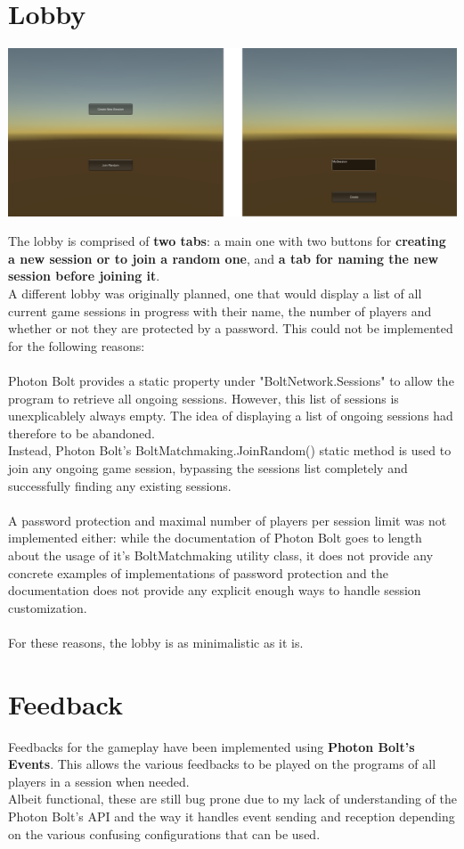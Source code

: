 \documentclass[12pt,a4paper]{article}
\begin{document}
\section{Lobby}
\begin{center}
\includegraphics[scale=0.4]{lobby}
\end{center}
The lobby is comprised of \textbf{two tabs}: a main one with two buttons for \textbf{creating a new session or to join a random one}, and \textbf{a tab for naming the new session before joining it}.\\
A different lobby was originally planned, one that would display a list of all current game sessions in progress with their name, the number of players and whether or not they are protected by a password. This could not be implemented for the following reasons:\\\\
Photon Bolt provides a static property under "BoltNetwork.Sessions" to allow the program to retrieve all ongoing sessions. However, this list of sessions is unexplicablely always empty. The idea of displaying a list of ongoing sessions had therefore to be abandoned.\\
Instead, Photon Bolt's BoltMatchmaking.JoinRandom() static method is used to join any ongoing game session, bypassing the sessions list completely and successfully finding any existing sessions.\\\\
A password protection and maximal number of players per session limit was not implemented either: while the documentation of Photon Bolt goes to length about the usage of it's BoltMatchmaking utility class, it does not provide any concrete examples of implementations of password protection and the documentation does not provide any explicit enough ways to handle session customization.\\\\
For these reasons, the lobby is as minimalistic as it is.

\section{Feedback}
Feedbacks for the gameplay have been implemented using \textbf{Photon Bolt's Events}. This allows the various feedbacks to be played on the programs of all players in a session when needed.\\
Albeit functional, these are still bug prone due to my lack of understanding of the Photon Bolt's API and the way it handles event sending and reception depending on the various confusing configurations that can be used.
\end{document}
